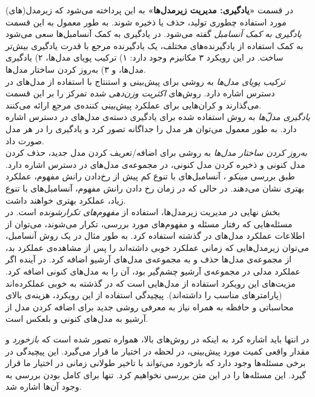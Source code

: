 در قسمت 
\textbf{
«یادگیری: مدیریت زیرمدل‌ها»
} 
به این پرداخته می‌شود که زیرمدل(های) مورد استفاده چطوری تولید، حذف یا ذخیره شوند. به طور معمول به این قسمت 
\textit{
یادگیری به کمک آنسامبل
} 
گفته می‌شود. در یادگیری به کمک آنسامبل‌ها سعی می‌شود به کمک استفاده از یادگیرنده‌های مختلف، یک یادگیرنده مرجع با قدرت یادگیری بیش‌تر ساخت. در این رویکرد ۳ مکانیزم وجود دارد: ۱) ترکیب پویای مدل‌ها، ۲) یادگیری مدل‌ها، و ۳) به‌روز کردن ساختار مدل‌ها.\\
\textit{
ترکیب پویای مدل‌ها
} 
به روشی برای پیش‌بینی و استنتاج با استفاده از مدل‌های در دسترس اشاره دارد. روش‌های 
\textit{
اکثریت وزن‌دهی شده
} 
تمرکز را بر این قسمت می‌گذارند و کران‌هایی برای عملکرد پیش‌بینی کننده‌ی مرجع ارائه می‌کنند.\\
\textit{
یادگیری مدل‌ّها
} 
به روش استفاده شده برای یادگیری دسته‌ی مدل‌های در دسترس اشاره دارد. به طور معمول می‌توان هر مدل را جداگانه تصور کرد و یادگیری را در هر مدل صورت داد.\\
\textit{
به‌روز کردن ساختار مدل‌ها
} 
به روشی برای اضافه/تعریف کردن مدل جدید، حذف کردن مدل کنونی و ذخیره کردن مدل کنونی، در مجموعه‌ی مدل‌های در دسترس اشاره دارد. طبق بررسی 
\textit{
مینکو
}، 
آنسامبل‌های با تنوع کم پیش از رخ‌دادن رانش مفهوم، عملکرد بهتری نشان می‌دهند. در حالی که در زمان رخ دادن رانش مفهوم، آنسامبل‌های با تنوع زیاد، عملکرد بهتری خواهند داشت.\\
بخش نهایی در مدیریت زیرمدل‌ها، استفاده از 
\textit{
مفهوم‌های تکرارشونده
} 
است. در مسئله‌هایی که رفتار مسئله و مفهوم‌های مورد بررسی، تکرار می‌شوند، می‌توان از اطلاعات عملکرد مدل‌های در گذشته استفاده کرد. به طور مثال در یک روش آنسامبل، می‌توان زیرمدل‌هایی که زمانی عملکرد خوبی داشته‌اند را پس از مشاهده‌ی عملکرد بد، از مجموعه‌ی مدل‌ها حذف و به مجموعه‌ی مدل‌های آرشیو اضافه کرد. در آینده اگر عملکرد مدلی در مجموعه‌ی آرشیو چشم‌گیر بود، آن را به مدل‌های کنونی اضافه کرد. مزیت‌های این رویکرد استفاده از مدل‌هایی است که در گذشته به خوبی عملکرده‌اند (پارامترهای مناسب را داشته‌اند). پیچیدگی استفاده از این رویکرد، هزینه‌ی بالای محاسباتی و حافظه به همراه نیاز به معرفی روشی جدید برای اضافه کردن مدل از آرشیو به مدل‌های کنونی و بلعکس است.


در انتها باید اشاره کرد به اینکه در روش‌های بالا، همواره تصور شده است که 
\textit{
بازخورد
} 
و مقدار واقعی کمیت مورد پیش‌بینی، در لحظه در اختیار ما قرار می‌گیرد. این پیچیدگی در برخی مسئله‌ها وجود دارد که بازخورد می‌تواند با تاخیر طولانی زمانی در اختیار ما قرار گیرد. این مسئله‌ها را در این متن بررسی نخواهیم کرد. تنها برای کامل بودن بررسی به وجود آن‌ها اشاره شد.

